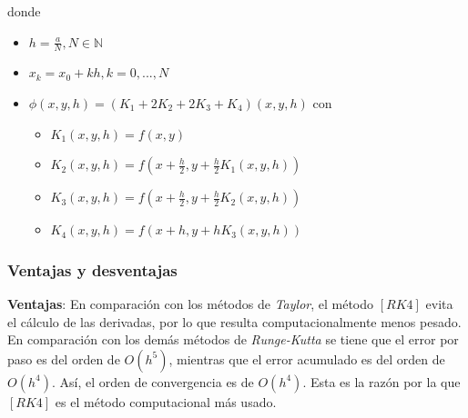 \documentclass[paper=a4, fontsize=11pt]{scrartcl} %
\numberwithin{equation}{section}
\begin{document}
	donde
	\begin{itemize}
		\item $h=\frac{a}{N} , N\in\mathbb{N}$
		\item $x_k = x_0 + kh , k=0,...,N$
		\item $\phi(x,y,h) = (K_1+2K_2+2K_3+K_4)(x,y,h)$ con 
		\begin{itemize}
			\item $K_1(x,y,h)=f(x,y)$
			\item $K_2(x,y,h)=f(x+\frac{h}{2},y+\frac{h}{2}K_1(x,y,h))$
			\item $K_3(x,y,h)=f(x+\frac{h}{2},y+\frac{h}{2}K_2(x,y,h))$
			\item $K_4(x,y,h)=f(x+h,y+hK_3(x,y,h))$
		\end{itemize}
	\end{itemize}
	\begin{center}
	\end{center}
	
	\subsubsection{Ventajas y desventajas}
	\textbf{Ventajas}: \newline
	En comparación con los métodos de \textit{Taylor}, el método $[RK4]$ evita el cálculo de las derivadas, por lo que resulta computacionalmente menos pesado.\newline
	En comparación con los demás métodos de \textit{Runge-Kutta} se tiene que el error por paso es del orden de $O(h^5)$, mientras que el error acumulado es del orden de $O(h^4)$. Así, el orden de convergencia es de $O(h^4)$. Esta es la razón por la que $[RK4]$ es el método computacional más usado.
	
\end{document}
